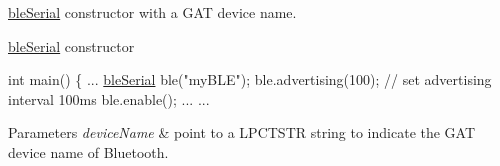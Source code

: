 \hyperlink{classble_serial}{ble\-Serial} constructor with a G\-A\-T device name. 

\hyperlink{classble_serial}{ble\-Serial} constructor 
\begin{DoxyCode}
\textcolor{keywordtype}{int} main() \{
        ...
        \hyperlink{classble_serial}{bleSerial} ble(\textcolor{stringliteral}{"myBLE"});
        ble.advertising(100);   \textcolor{comment}{// set advertising interval 100ms}
        ble.enable();
        ...
        ...
\end{DoxyCode}
 
\begin{DoxyParams}{Parameters}
{\em device\-Name} & point to a L\-P\-C\-T\-S\-T\-R string to indicate the G\-A\-T device name of Bluetooth. \\
\hline
\end{DoxyParams}


